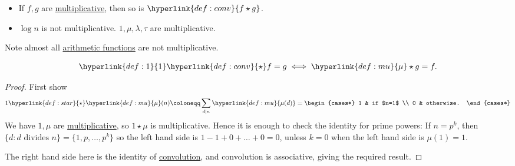 \documentclass{article}
\newcommand{\named}[1]{\textbf{#1}\index{#1}}
\begin{document}
\begin{fact}\leavevmode
  \begin{itemize}
    \item If $f,g$ are \hyperlink{def:multi}{multiplicative}, then so is $\hyperlink{def:conv}{f\star g}$.
    \item $\log n $ is not multiplicative.
      $1,\mu,\lambda,\tau$ are multiplicative.
  \end{itemize}
  Note almost all \hyperlink{def:arith}{arithmetic functions} are not multiplicative.
\end{fact}
\begin{fact}
  \begin{equation*}
    \hyperlink{def:1}{1} \hyperlink{def:conv}{\star} f = g \iff \hyperlink{def:mu}{\mu} \star g = f.
  \end{equation*}
\end{fact}

\begin{proof}
  First show
  \begin{equation*}
    1 \hyperlink{def:star}{\star} \hyperlink{def:mu}{\mu}(n) \coloneqq
    \sum_{d \mid n} \hyperlink{def:mu}{\mu(d)} =
    \begin{cases*}
      1 & if $n=1$ \\
      0 & otherwise.
    \end{cases*}
  \end{equation*}
  We have $1,\mu$ are \hyperlink{def:multi}{multiplicative}, so $1\star\mu$ is multiplicative.
  Hence it is enough to check the identity for prime powers:
  If $n= p^k$, then $\{d : d\text{ divides }n\} = \{1,p,\ldots,p^k\}$ so the left hand side is $1-1 + 0 + \ldots + 0 = 0$, unless $k=0$ when the left hand side is $\mu(1) =1$.

  The right hand side here is the identity of \hyperlink{def:conv}{convolution}, and convolution is associative, giving the required result.
\end{proof}
\end{document}
